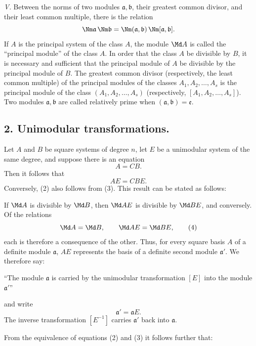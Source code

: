 \emph{V.} Between the norms of two modules $\mathfrak a,\mathfrak b$, their greatest common divisor, and their least common multiple, there is the relation
\[
 \Nm\mathfrak a\,\Nm\mathfrak b
 =\Nm(\mathfrak a,\mathfrak b)\,\Nm[\mathfrak a,\mathfrak b].
\]
If $A$ is the principal system of the class $A$, the module $\Md A$ is called the ``principal module'' of the class $A$. In order that the class $A$ be divisible by $B$, it is necessary and sufficient that the principal module of $A$ be divisible by the principal module of $B$. The greatest common divisor (respectively, the least common multiple) of the principal modules of the classes $A_1,A_2,\ldots,A_s$ is the principal module of the class $(A_1,A_2,\ldots,A_s)$ (respectively, $[A_1,A_2,\ldots,A_s]$). Two modules $\mathfrak a,\mathfrak b$ are called relatively prime when $(\mathfrak a,\mathfrak b)=\mathfrak e$.

\subsection*{2. Unimodular transformations.}

Let $A$ and $B$ be square systems of degree $n$, let $E$ be a unimodular system of the same degree, and suppose there is an equation
\begin{equation}
 A=CB.
\tag{2}
\end{equation}
Then it follows that
\begin{equation}
 AE=CBE.
\tag{3}
\end{equation}
Conversely, (2) also follows from (3). This result can be stated as follows:

If $\Md A$ is divisible by $\Md B$, then $\Md AE$ is divisible by $\Md BE$, and conversely. Of the relations
\begin{equation}
 \Md A=\Md B,
 \qquad
 \Md AE=\Md BE,
\tag{4}
\end{equation}
each is therefore a consequence of the other. Thus, for every square basis $A$ of a definite module $\mathfrak a$, $AE$ represents the basis of a definite second module $\mathfrak a'$. We therefore say:

``The module $\mathfrak a$ is carried by the unimodular transformation $[E]$ into the module $\mathfrak a'$''

and write
\[
 \mathfrak a'=\mathfrak aE.
\]
The inverse transformation $[E^{-1}]$ carries $\mathfrak a'$ back into $\mathfrak a$.

From the equivalence of equations (2) and (3) it follows further that:

